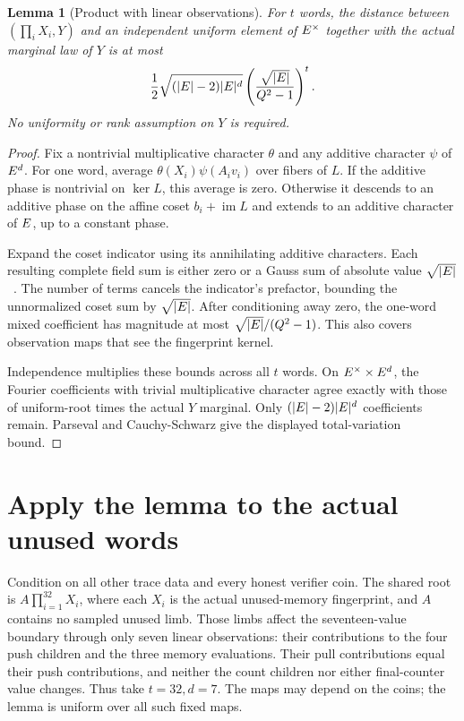 \documentclass[11pt]{article}
\newtheorem{lemma}{Lemma}
\begin{document}
\begin{lemma}[Product with linear observations]
For $t$ words, the distance between $(\prod_iX_i,Y)$ and an independent uniform element of $E^\times$ together with the \emph{actual marginal law of $Y$} is at most
\[
 \frac12\sqrt{(|E|-2)|E|^d}
 \left(\frac{\sqrt{|E|}}{Q^2-1}\right)^t.
\]
No uniformity or rank assumption on $Y$ is required.
\end{lemma}
\begin{proof}
Fix a nontrivial multiplicative character $\theta$ and any additive character $\psi$ of $E^d$. For one word, average $\theta(X_i)\psi(A_iv_i)$ over fibers of $L$. If the additive phase is nontrivial on $\ker L$, this average is zero. Otherwise it descends to an additive phase on the affine coset $b_i+\operatorname{im}L$ and extends to an additive character of $E$, up to a constant phase.

Expand the coset indicator using its annihilating additive characters. Each resulting complete field sum is either zero or a Gauss sum of absolute value $\sqrt{|E|}$~\cite{conrad}. The number of terms cancels the indicator's prefactor, bounding the unnormalized coset sum by $\sqrt{|E|}$. After conditioning away zero, the one-word mixed coefficient has magnitude at most $\sqrt{|E|}/(Q^2-1)$. This also covers observation maps that see the fingerprint kernel.

Independence multiplies these bounds across all $t$ words. On $E^\times\times E^d$, the Fourier coefficients with trivial multiplicative character agree exactly with those of uniform-root times the actual $Y$ marginal. Only $(|E|-2)|E|^d$ coefficients remain. Parseval and Cauchy-Schwarz give the displayed total-variation bound.
\end{proof}

\section{Apply the lemma to the actual unused words}

Condition on all other trace data and every honest verifier coin. The shared root is $A\prod_{i=1}^{32}X_i$, where each $X_i$ is the actual unused-memory fingerprint, and $A$ contains no sampled unused limb. Those limbs affect the seventeen-value boundary through only seven linear observations: their contributions to the four push children and the three memory evaluations. Their pull contributions equal their push contributions, and neither the count children nor either final-counter value changes. Thus take $t=32,d=7$. The maps may depend on the coins; the lemma is uniform over all such fixed maps.
\end{document}
